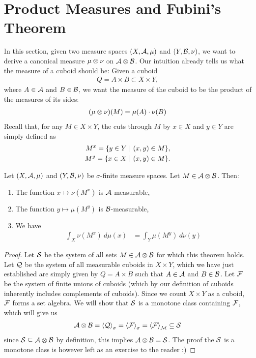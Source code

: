 \section{Product Measures and Fubini's Theorem}
In this section, given two measure spaces $(X, \mathcal{A}, \mu)$ and $(Y, \mathcal{B}, \nu)$, we want to derive a canonical measure $\mu \otimes \nu$ on $\mathcal{A} \otimes \mathcal{B}$. Our intuition already tells us what the measure of a cuboid should be: Given a cuboid
\begin{align*}
	Q = A \times B \subset X \times Y,
\end{align*}
where $A \in \mathcal{A}$ and $B \in \mathcal{B}$, we want the measure of the cuboid to be the product of the measures of its sides:
\begin{align*}
	(\mu \otimes \nu)(M) = \mu(A) \cdot \nu(B)
\end{align*}
Recall that, for any $M \in X \times Y$, the cuts through $M$ by $x \in X$ and $y \in Y$ are simply defined as
\begin{align*}
	M^x = \qty{y \in Y ~\middle|~(x,y) \in M},\\
	M^y = \qty{x \in X ~\middle|~(x,y) \in M}.
\end{align*}
\begin{importanttheorem}{}{}
	Let $(X,\mathcal{A}, \mu)$ and $(Y, \mathcal{B}, \nu)$ be $\sigma$-finite measure spaces. Let $M \in \mathcal{A} \otimes \mathcal{B}$. Then:
	\begin{enumerate}
		\item The function $x \mapsto \nu(M^x)$ is $\mathcal{A}$-measurable,
		\item The function $y \mapsto \mu(M^y)$ is $\mathcal{B}$-measurable,
		\item We have
		\begin{align*}
			\int_X \nu(M^x) ~d\mu(x)
			&=
			\int_Y \mu(M^y) ~d\nu(y)
		\end{align*}
	\end{enumerate}
\end{importanttheorem}
\begin{proof}
	Let $\mathcal{S}$ be the system of all sets $M \in \mathcal{A} \otimes \mathcal{B}$ for which this theorem holds.
	\newpar
	Let $\mathcal{Q}$ be the system of all measurable cuboids in $X \times Y$, which we have just established are simply given by $Q = A \times B$ such that $A \in \mathcal{A}$ and $B \in \mathcal{B}$.
	\newpar
	Let $\mathcal{F}$ be the system of finite unions of cuboids (which by our definition of cuboids inherently includes complements of cuboids). Since we count $X \times Y$ as a cuboid, $\mathcal{F}$ forms a set algebra.
	\newpar
	We will show that $\mathcal{S}$ is a monotone class containing $\mathcal{F}$, which will give us
	\begin{align*}
		\mathcal{A} \otimes \mathcal{B} = \left\langle \mathcal{Q} \right\rangle_\sigma = \left\langle \mathcal{F} \right\rangle_\sigma = \left\langle \mathcal{F} \right\rangle_{\mathcal{M}} \subseteq \mathcal{S}
	\end{align*}
	since $\mathcal{S} \subseteq \mathcal{A} \otimes \mathcal{B}$ by definition, this implies $\mathcal{A} \otimes \mathcal{B} = \mathcal{S}$.
	\newpar
	The proof the $\mathcal{S}$ is a monotone class is however left as an exercise to the reader :)
\end{proof}
